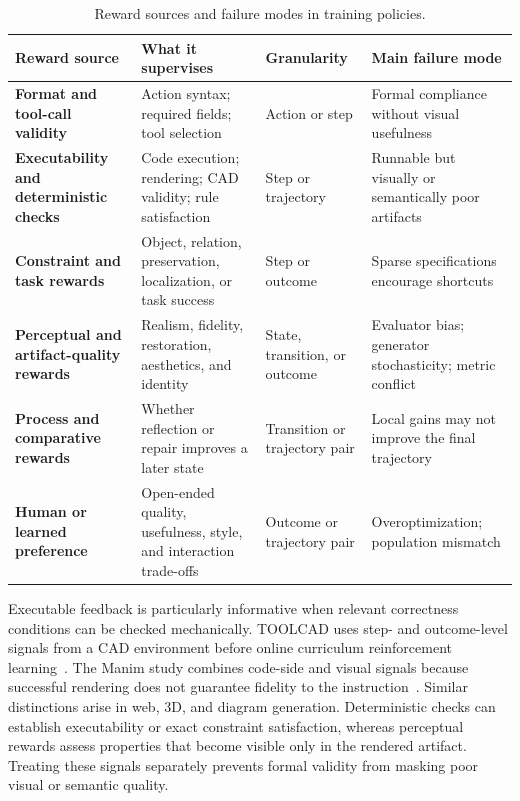 \begin{table}[t]
  \caption{Reward sources and failure modes in training \AVG{} policies.}
  \label{tab:reward-sources}
  \small
  \setlength{\tabcolsep}{4pt}
  \renewcommand{\arraystretch}{1.08}
  \renewcommand{\tabularxcolumn}[1]{m{#1}}
  \begin{tabularx}{\textwidth}{@{}
    >{\raggedright\arraybackslash\bfseries}m{}
    >{\raggedright\arraybackslash}m{}
    >{\raggedright\arraybackslash}m{}
    >{\raggedright\arraybackslash}X@{}}
    \toprule
    Reward source & \textbf{What it supervises} & \textbf{Granularity} & \textbf{Main failure mode} \\
    \midrule
    Format and tool-call validity & Action syntax; required fields; tool selection & Action or step & Formal compliance without visual usefulness \\
    \midrule
    Executability and deterministic checks & Code execution; rendering; CAD validity; rule satisfaction & Step or trajectory & Runnable but visually or semantically poor artifacts \\
    \midrule
    Constraint and task rewards & Object, relation, preservation, localization, or task success & Step or outcome & Sparse specifications encourage shortcuts \\
    \midrule
    Perceptual and artifact-quality rewards & Realism, fidelity, restoration, aesthetics, and identity & State, transition, or outcome & Evaluator bias; generator stochasticity; metric conflict \\
    \midrule
    Process and comparative rewards & Whether reflection or repair improves a later state & Transition or trajectory pair & Local gains may not improve the final trajectory \\
    \midrule
    Human or learned preference & Open-ended quality, usefulness, style, and interaction trade-offs & Outcome or trajectory pair & Overoptimization; population mismatch \\
    \bottomrule
  \end{tabularx}
\end{table}
\FloatBarrier

Executable feedback is particularly informative when relevant correctness conditions can be checked mechanically. TOOLCAD uses step- and outcome-level signals from a CAD environment before online curriculum reinforcement learning~\cite{gong2026toolcad}. The Manim study combines code-side and visual signals because successful rendering does not guarantee fidelity to the instruction~\cite{avg260418364}. Similar distinctions arise in web, 3D, and diagram generation. Deterministic checks can establish executability or exact constraint satisfaction, whereas perceptual rewards assess properties that become visible only in the rendered artifact. Treating these signals separately prevents formal validity from masking poor visual or semantic quality.

